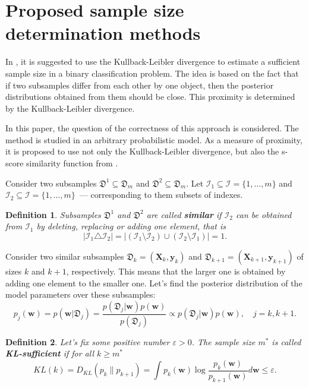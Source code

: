 \documentclass[sn-mathphys-num]{sn-jnl}%
\newtheorem{definition}{Definition}%
\begin{document}
\section{Proposed sample size determination methods}
In \cite{MOTRENKO2014743}, it is suggested to use the Kullback-Leibler divergence to estimate a sufficient sample size in a binary classification problem. The idea is based on the fact that if two subsamples differ from each other by one object, then the posterior distributions obtained from them should be close. This proximity is determined by the Kullback-Leibler divergence. 

In this paper, the question of the correctness of this approach is considered. The method is studied in an arbitrary probabilistic model. As a measure of proximity, it is proposed to use not only the Kullback-Leibler divergence, but also the s-score similarity function from \cite{Aduenko2017}.

Consider two subsamples $\mathfrak{D}^1\subseteq\mathfrak{D}_m$ and $\mathfrak{D}^2\subseteq\mathfrak{D}_m$. Let $\mathcal{I}_1 \subseteq \mathcal{I} = \{1, \ldots, m\}$ and $\mathcal{I}_2 \subseteq \mathcal{I} =\{1, \ldots,m\}$~--- corresponding to them subsets of indexes.

\begin{definition}
    Subsamples $\mathfrak{D}^1$ and $\mathfrak{D}^2$ are called \textbf{similar} if $\mathcal{I}_2$ can be obtained from $\mathcal{I}_1$ by deleting, replacing or adding one element, that is
    \[ \left| \mathcal{I}_1 \triangle \mathcal{I}_2 \right| = \left| \left( \mathcal{I}_1 \setminus \mathcal{I}_2 \right) \cup \left( \mathcal{I}_2 \setminus \mathcal{I}_1 \right) \right| = 1. \]
\end{definition}

Consider two similar subsamples $\mathfrak{D}_k = (\mathbf{X}_k,\mathbf{y}_k)$ and $\mathfrak{D}_{k+1} = (\mathbf{X}_{k+1}, \mathbf{y}_{k+1})$ of sizes $k$ and $k+1$, respectively. This means that the larger one is obtained by adding one element to the smaller one. Let's find the posterior distribution of the model parameters over these subsamples:
\[p_j(\mathbf{w}) = p(\mathbf{w} | \mathfrak{D}_j) = \frac{p(\mathfrak{D}_j | \mathbf{w}) p(\mathbf{w})}{p(\mathfrak{D}_j)} \propto p(\mathfrak{D}_j | \mathbf{w}) p(\mathbf{w}), \quad j = k, k+1. \]

\begin{definition}
    Let's fix some positive number $\varepsilon > 0$. The sample size $m^*$ is called \textbf{KL-sufficient} if for all $k\geqslant m^*$
    \[ KL(k) = D_{KL}(p_k \| p_{k+1}) = \int p_k(\mathbf{w}) \log{\frac{p_k(\mathbf{w})}{p_{k+1}(\mathbf{w})}} d\mathbf{w} \leqslant \varepsilon. \]
\end{definition}
\end{document}
